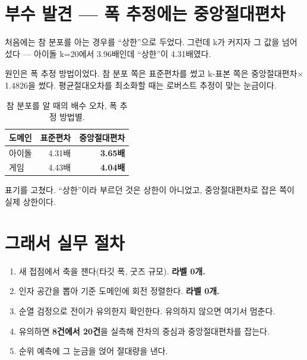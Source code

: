 \documentclass[10pt]{article}
\begin{document}
\section{부수 발견 --- 폭 추정에는 중앙절대편차}

처음에는 참 분포를 아는 경우를 ``상한''으로 두었다. 그런데 k가 커지자 그 값을
넘어섰다 --- 아이돌 k=20에서 3.96배인데 ``상한''이 4.31배였다.

원인은 폭 추정 방법이었다. 참 분포 쪽은 표준편차를 썼고 k-표본 쪽은
중앙절대편차$\times$1.4826을 썼다. 평균절대오차를 최소화할 때는 로버스트
추정이 맞는 눈금이다.

\begin{table}[t]
\centering\tsize
\caption{참 분포를 알 때의 배수 오차, 폭 추정 방법별.}
\begin{tabular}{lrr}
\toprule
도메인 & 표준편차 & 중앙절대편차 \\
\midrule
아이돌 & 4.31배 & \textbf{3.65배} \\
게임 & 4.43배 & \textbf{4.04배} \\
\bottomrule
\end{tabular}
\end{table}

표기를 고쳤다. ``상한''이라 부르던 것은 상한이 아니었고, 중앙절대편차로 잡은
쪽이 실제 상한이다.


\section{그래서 실무 절차}

\begin{enumerate}[leftmargin=1.3em,itemsep=0.2em]
\item 새 접점에서 축을 잰다(타깃 폭, 굿즈 규모). \textbf{라벨 0개.}
\item 인자 공간을 뽑아 기준 도메인에 회전 정렬한다. \textbf{라벨 0개.}
\item 순열 검정으로 전이가 유의한지 확인한다. 유의하지 않으면 여기서 멈춘다.
\item 유의하면 \textbf{8건에서 20건}을 실측해 잔차의 중심과 중앙절대편차를 잡는다.
\item 순위 예측에 그 눈금을 얹어 절대량을 낸다.
\end{enumerate}
\end{document}
